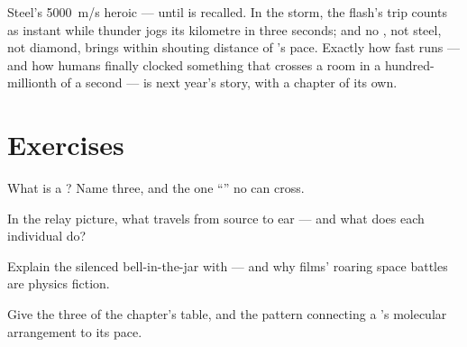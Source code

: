 \begin{remark}\label{rem:g7:sound-production:light}
Steel's \qty{5000}{m/s}  heroic --- until  is
recalled. In the storm, the flash's trip counts as instant while
thunder jogs its kilometre in three seconds; and no , not
steel, not diamond, brings  within shouting distance of
's pace. Exactly how fast  runs --- and how humans
finally clocked something that crosses a room in a
hundred-millionth of a second --- is next year's story, with a
chapter of its own.
\end{remark}

\section{Exercises}

\begin{exercise}[$\star$]\label{exo:g7:sound-production:1}
What is a ? Name three, and the one ``'' no
 can cross.
\end{exercise}

\begin{exercise}[$\star$]\label{exo:g7:sound-production:2}
In the relay picture, what travels from source to ear --- and
what does each individual  do?
\end{exercise}

\begin{exercise}[$\star$]\label{exo:g7:sound-production:3}
Explain the silenced bell-in-the-jar with  --- and why
films' roaring space battles are physics fiction.
\end{exercise}

\begin{exercise}[$\star$]\label{exo:g7:sound-production:4}
Give the three  of the chapter's table, and the pattern
connecting a 's molecular arrangement to its pace.
\end{exercise}

